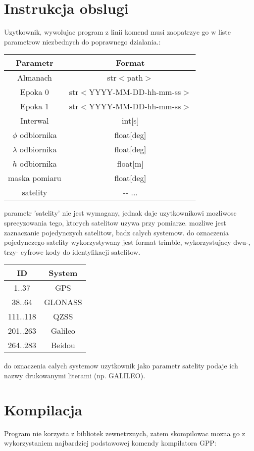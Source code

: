 \documentclass[twocolumn]{article}
\begin{document}
\section{Instrukcja obslugi}
Uzytkownik, wywolujac program z linii komend musi zaopatrzyc go w liste parametrow niezbednych do poprawnego dzialania.:
\begin{center}
\begin{tabular}{|c|c|}
\hline
     Parametr & Format  \\
\hline
     Almanach & str\(<\)path\(>\) \\
\hline
     Epoka 0 & str\(<\)YYYY-MM-DD-hh-mm-ss\(>\) \\
\hline
     Epoka 1 & str\(<\)YYYY-MM-DD-hh-mm-ss\(>\) \\
\hline
     Interwal & int[s] \\
\hline
     \(\phi\) odbiornika & float[deg] \\
\hline
     \(\lambda\) odbiornika & float[deg] \\
\hline
     \(h\) odbiornika & float[m] \\
\hline
     maska pomiaru & float[deg] \\
\hline
     satelity & -\hspace{0.02cm}- ... \\
\hline
\end{tabular}
\end{center}
parametr 'satelity' nie jest wymagany, jednak daje uzytkownikowi mozliwosc sprecyzowania tego, ktorych satelitow uzywa przy pomiarze. mozliwe jest zaznaczanie pojedynczych satelitow, badz calych systemow. do oznaczenia pojedynczego satelity wykorzystywany jest format trimble, wykorzystujacy dwu-, trzy- cyfrowe kody do identyfikacji satelitow.
\begin{center}
\begin{tabular}{|c|c|}
\hline
     ID & System \\
\hline
     1..37 & GPS \\
\hline
     38..64 & GLONASS \\
\hline
     111..118 & QZSS \\
\hline
     201..263 & Galileo \\
\hline
     264..283 & Beidou \\
\hline
\end{tabular}
\end{center}
do oznaczenia calych systemow uzytkownik jako parametr satelity podaje ich nazwy drukowanymi literami (np. GALILEO).
\section{Kompilacja}
Program nie korzysta z bibliotek zewnetrznych, zatem skompilowac mozna go z wykorzystaniem najbardziej podstawowej komendy kompilatora GPP:
\end{document}
